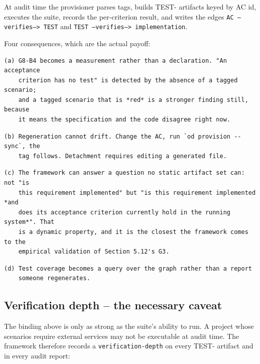 \documentclass[11pt,a4paper]{article}
\begin{document}
At audit time the provisioner parses tags, builds TEST- artifacts keyed by AC id, executes the suite, records the per-criterion result, and writes the edges \texttt{AC --verifies--> TEST} and \texttt{TEST --verifies--> implementation}.

Four consequences, which are the actual payoff:

\begin{Verbatim}[fontsize=\footnotesize,breaklines=true,breakanywhere=true,breakautoindent=false,samepage=false]
(a) G8-B4 becomes a measurement rather than a declaration. "An acceptance
    criterion has no test" is detected by the absence of a tagged scenario;
    and a tagged scenario that is *red* is a stronger finding still, because
    it means the specification and the code disagree right now.
\end{Verbatim}

\begin{Verbatim}[fontsize=\footnotesize,breaklines=true,breakanywhere=true,breakautoindent=false,samepage=false]
(b) Regeneration cannot drift. Change the AC, run `od provision --sync`, the
    tag follows. Detachment requires editing a generated file.
\end{Verbatim}

\begin{Verbatim}[fontsize=\footnotesize,breaklines=true,breakanywhere=true,breakautoindent=false,samepage=false]
(c) The framework can answer a question no static artifact set can: not "is
    this requirement implemented" but "is this requirement implemented *and
    does its acceptance criterion currently hold in the running system*". That
    is a dynamic property, and it is the closest the framework comes to the
    empirical validation of Section 5.12's G3.
\end{Verbatim}

\begin{Verbatim}[fontsize=\footnotesize,breaklines=true,breakanywhere=true,breakautoindent=false,samepage=false]
(d) Test coverage becomes a query over the graph rather than a report
    someone regenerates.
\end{Verbatim}

\subsection{Verification depth -- the necessary caveat}

The binding above is only as strong as the suite's ability to run. A project whose scenarios require external services may not be executable at audit time. The framework therefore records a \texttt{verification-depth} on every TEST- artifact and in every audit report:
\end{document}
